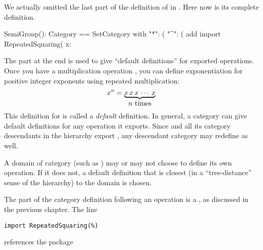{{%

We actually omitted the last
part of the definition of
 in
.
Here now is its complete \Language{} definition.

\begin{xmpLines}
SemiGroup(): Category == SetCategory with
      "*": (%
      "^": (%
    add
      import RepeatedSquaring(%
      x: %
\end{xmpLines}

The  part at the end is used to give ``default definitions'' for
exported operations.
Once you have a multiplication operation \spadop{*}, you can
define exponentiation
for positive integer exponents
using repeated multiplication:
\begin{displaymath}
x^n = {\underbrace{x \, x \, x \, \cdots \, x}_{\displaystyle n \hbox{\ times}}}
\end{displaymath}
This definition for \spadop{^} is called a {\it default} definition.
In general, a category can give default definitions for any
operation it exports.
Since  and all its category descendants in the hierarchy
export \spadop{^}, any descendant category may redefine \spadop{^} as well.

A domain of category 
(such as ) may or may not choose to
define its own \spadop{^} operation.
If it does not, a default definition that is closest (in a ``tree-distance''
sense of the hierarchy) to the domain is chosen.

The part of the category definition following an  operation
is a , as discussed in
the previous chapter.
The line
\begin{verbatim}
import RepeatedSquaring(%)
\end{verbatim}
references the package
\spadtype{RepeatedSquaring(%
\spadtype{RepeatedSquaring} that takes ``this domain'' as its
parameter.
For example, if the semigroup \spadtype{Polynomial (Integer)}
does not define its own exponentiation operation, the
definition used may come from the package
\spadtype{RepeatedSquaring (Polynomial (Integer))}.
The next line gives the definition in terms of \spadfun{expt} from that
package.

}}}
